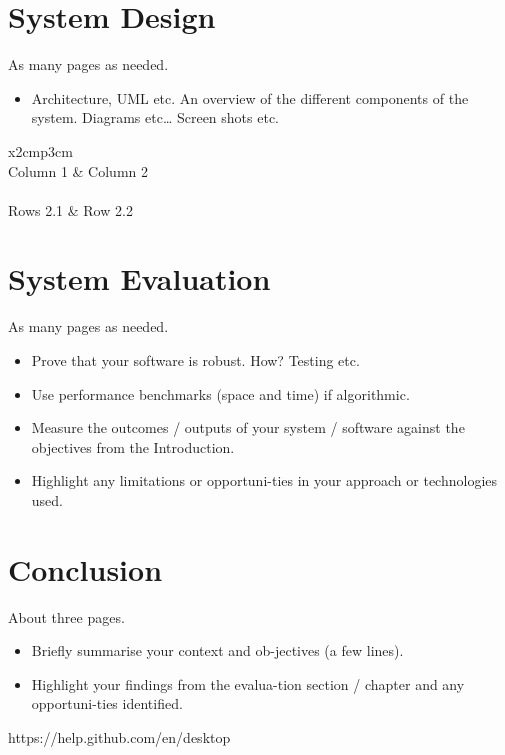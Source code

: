 \chapter{System Design}
As many pages as needed.
\begin{itemize}
\item Architecture, UML etc. An overview of the different components of the system. Diagrams etc… Screen shots etc.
\end{itemize}

\begin{table}[h]
  \centering
  \begin{tabular}{x{2cm}p{3cm}}
    \toprule \\
    Column 1 & Column 2 \\
    \midrule \\
    Rows 2.1 & Row 2.2 \\
    \bottomrule
  \end{tabular}
  \caption{A table.}
  \label{table:mytable}
\end{table}

\chapter{System Evaluation}
As many pages as needed.
\begin{itemize}
\item Prove that your software is robust. How? Testing etc. 
\item Use performance benchmarks (space and time) if algorithmic.
\item Measure the outcomes / outputs of your system / software against the objectives from the Introduction.
\item Highlight any limitations or opportuni-ties in your approach or technologies used.
\end{itemize}

\chapter{Conclusion}
About three pages.

\begin{itemize}
\item Briefly summarise your context and ob-jectives (a few lines).
\item Highlight your findings from the evalua-tion section / chapter and any opportuni-ties identified.
\end{itemize}

https://help.github.com/en/desktop

